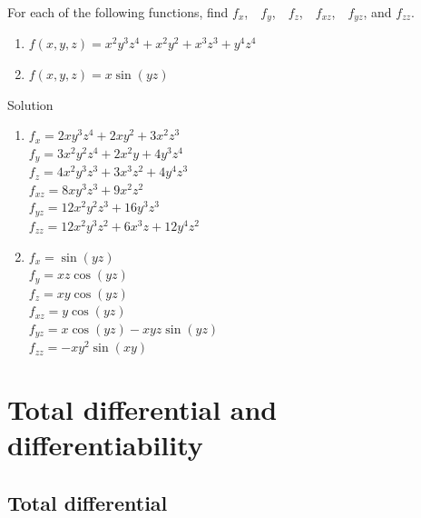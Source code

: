 \begin{example}\label{ex_partial8}
For each of the following functions, find $f_x$,\ \ $f_y$,\ \ $f_z$,\ \  $f_{xz}$,\ \  $f_{yz}$, and $f_{zz}$.
\begin{multicols}{2}
\begin{enumerate}
	\item $f(x,y,z) = x^2y^3z^4+x^2y^2+x^3z^3+y^4z^4$
	\item	$f(x,y,z) = x\sin (yz)$
\end{enumerate}
\end{multicols}

Solution 

\begin{enumerate}
	\item \begin{multicols}{2}
 $f_x = 2xy^3z^4+2xy^2+3x^2z^3$\\
	$f_y = 3x^2y^2z^4+2x^2y+4y^3z^4$\\
	$f_z = 4x^2y^3z^3+3x^3z^2+4y^4z^3$\\
	$f_{xz} = 8xy^3z^3+9x^2z^2$\\
	$f_{yz} = 12x^2y^2z^3+16y^3z^3$\\
	$f_{zz} = 12x^2y^3z^2+6x^3z+12y^4z^2$
	\end{multicols}
	\item	\begin{multicols}{3} 
	$f_x = \sin(yz)$\\
	 $f_y = xz\cos(yz)$\\
	  $f_z = xy\cos(yz)$\\
	   $f_{xz} = y\cos(yz)$\\
	    $f_{yz} = x\cos(yz) - xyz\sin(yz)$\\
	     $f_{zz} = -xy^2\sin(xy)$\end{multicols}
	\end{enumerate}
	\end{example}
	
	
	
	\section{Total differential and differentiability}\label{sec:total_differential}
\subsection{Total differential}
	\checkoddpage
{}

